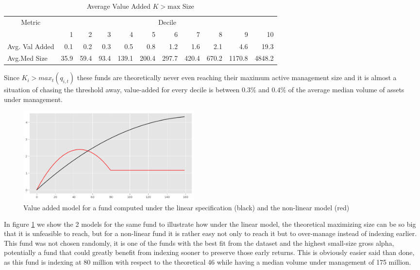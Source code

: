 \documentclass[12pt]{article}
\begin{document}
\begin{table}[H]
    \centering
        \caption{Average Value Added $K > \text{max}$ Size}
        \label{tab:value-added-size-k>max}
        \begin{tabular}{lrrrrrrrrrr}
            \toprule
            \multicolumn{1}{c}{Metric} & \multicolumn{10}{c}{Decile} \\
            \cmidrule(lr){2-11}
            \multicolumn{1}{c}{} & 1 & 2 & 3 & 4 & 5 & 6 & 7 & 8 & 9 & 10 \\
            \midrule
            Avg. Val Added & 0.1 & 0.2 & 0.3 & 0.5 & 0.8 & 1.2 & 1.6 & 2.1 & 4.6 & 19.3 \\
            Avg.Med Size & 35.9 & 59.4 & 93.4 & 139.1 & 200.4 & 297.7 & 420.4 & 670.2 & 1170.8 & 4848.2 \\
            \bottomrule
        \end{tabular}
\end{table}


Since $K_i > max_{t}(q_{i,t})$ these funds are theoretically never even reaching their maximum active management size and it is almost a situation of chasing the threshold away, value-added for every decile is between $0.3\% $ and $0.4\% $ of the average median volume of assets under management.

\begin{figure}[h!]
    \centering
    \includegraphics[width=0.45\textwidth]{ChasingOptimal.png}
    \caption{Value added model for a fund computed under the linear specification (black) and the non-linear model (red)}
    \label{fig:ChasingOptimal}
\end{figure}

In figure \ref{fig:ChasingOptimal} we show the 2 models for the same fund to illustrate how under the linear model, the theoretical maximizing size can be so big that it is unfeasible to reach, but for a non-linear fund it is rather easy not only to reach it but to over-manage instead of indexing earlier. This fund was not chosen randomly, it is one of the funds with the best fit from the dataset and the highest small-size gross alpha, potentially a fund that could greatly benefit from indexing sooner to preserve those early returns. This is obviously easier said than done, as this fund is indexing at 80 million with respect to the theoretical 46 while having a median volume under management of 175 million.
\end{document}
